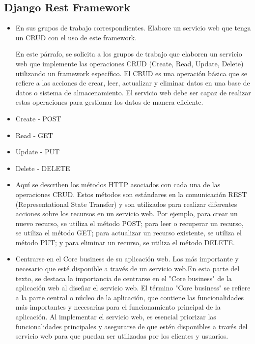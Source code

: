 \documentclass{article}
\begin{document}
	\subsection{Django Rest Framework}
	\begin{itemize}
		
	\item En sus grupos de trabajo correspondientes. Elabore un servicio web que tenga un CRUD con el uso de este framework.

	En este párrafo, se solicita a los grupos de trabajo que elaboren un servicio web que implemente las operaciones CRUD (Create, Read, Update, Delete) utilizando un framework específico. El CRUD es una operación básica que se refiere a las acciones de crear, leer, actualizar y eliminar datos en una base de datos o sistema de almacenamiento. El servicio web debe ser capaz de realizar estas operaciones para gestionar los datos de manera eficiente.

	\item Create - POST
	\item Read - GET
	\item Update - PUT
	\item Delete - DELETE

	\item Aquí se describen los métodos HTTP asociados con cada una de las operaciones CRUD. Estos métodos son estándares en la comunicación REST (Representational State Transfer) y son utilizados para realizar diferentes acciones sobre los recursos en un servicio web. Por ejemplo, para crear un nuevo recurso, se utiliza el método POST; para leer o recuperar un recurso, se utiliza el método GET; para actualizar un recurso existente, se utiliza el método PUT; y para eliminar un recurso, se utiliza el método DELETE.
	\item Centrarse en el Core business de su aplicación web. Los más importante y necesario que esté disponible a través de un servicio web.En esta parte del texto, se destaca la importancia de centrarse en el "Core business" de la aplicación web al diseñar el servicio web. El término "Core business" se refiere a la parte central o núcleo de la aplicación, que contiene las funcionalidades más importantes y necesarias para el funcionamiento principal de la aplicación. Al implementar el servicio web, es esencial priorizar las funcionalidades principales y asegurarse de que estén disponibles a través del servicio web para que puedan ser utilizadas por los clientes y usuarios.
	\end{itemize}
\end{document}
